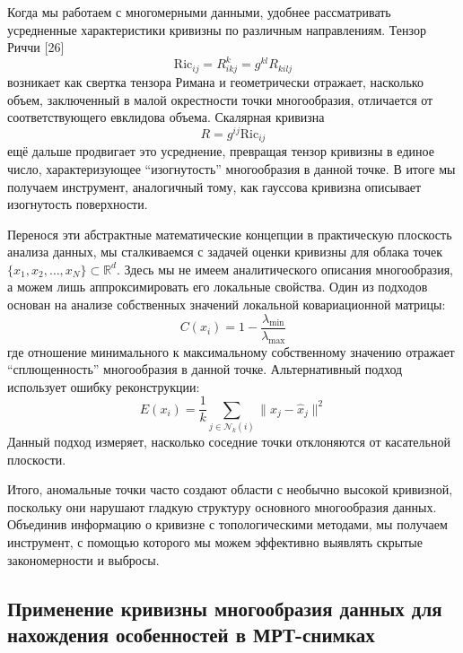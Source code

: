 \documentclass[a4paper,12pt]{extarticle}
\begin{document}
Когда мы работаем с многомерными данными, удобнее рассматривать усредненные характеристики кривизны по различным направлениям. Тензор Риччи [26] \begin{equation}\text{Ric}_{ij} = R^k_{ikj} = g^{kl}R_{kilj}\end{equation} возникает как свертка тензора Римана и геометрически отражает, насколько объем, заключенный в малой окрестности точки многообразия, отличается от соответствующего евклидова объема. Скалярная кривизна \begin{equation}R = g^{ij}\text{Ric}_{ij}\end{equation} ещё дальше продвигает это усреднение, превращая тензор кривизны в единое число, характеризующее ``изогнутость'' многообразия в данной точке. В итоге мы получаем инструмент, аналогичный тому, как гауссова кривизна описывает изогнутость поверхности.

Перенося эти абстрактные математические концепции в практическую плоскость анализа данных, мы сталкиваемся с задачей оценки кривизны для облака точек $\{x_1, x_2, \ldots, x_N\} \subset \mathbb{R}^d$. Здесь мы не имеем аналитического описания многообразия, а можем лишь аппроксимировать его локальные свойства. Один из подходов основан на анализе собственных значений локальной ковариационной матрицы: \begin{equation}C(x_i) = 1 - \frac{\lambda_{\min}}{\lambda_{\max}}\end{equation} где отношение минимального к максимальному собственному значению отражает ``сплющенность'' многообразия в данной точке. Альтернативный подход использует ошибку реконструкции: \begin{equation}E(x_i) = \frac{1}{k} \sum_{j \in \mathcal{N}_k(i)} \|x_j - \hat{x}_j\|^2\end{equation} Данный подход измеряет, насколько соседние точки отклоняются от касательной плоскости.

Итого, аномальные точки часто создают области с необычно высокой кривизной, поскольку они нарушают гладкую структуру основного многообразия данных. Объединив информацию о кривизне с топологическими методами, мы получаем инструмент, с помощью которого мы можем эффективно выявлять скрытые закономерности и выбросы.

\subsection{Применение кривизны многообразия данных для нахождения особенностей в МРТ-снимках}
\end{document}
